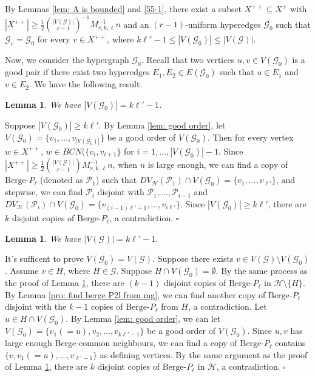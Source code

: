 \documentclass[12pt]{article}%
\newtheorem{lemma}[theorem]{Lemma}
\newenvironment{proof}{{\noindent\it Proof.}}{\hfill $\square$\par}
\newcommand{\ber}{\text{Berge-}}
\newcommand{\mh}{\mathcal{H}}
\newcommand{\mg}{\mathcal{G}}
\begin{document}
By Lemmas \ref{lem: A is bounded} and \ref{55-1},
  there exist a subset $X^{++}\subseteq X^+$ with  $|X^{++}|\ge\frac{1}{2}\binom{|V(\mg)|}{r-1}^{-1}M_{r,k,\ell}^{-1}n$ and an $(r-1)$-uniform hyperedges $\mathcal{G}_0$ such that $\mathcal{G}_v=\mathcal{G}_0$ for every $v\in X^{++}$, where $k\ell'-1\leq |V(\mg_0)|\leq |V(\mg)|$.

Now, we consider the hypergraph $\mathcal{G}_0$.
 Recall that two vertices $u,v\in V(\mg_0)$ is a good pair if there exist two hyperedges $E_1,E_2\in E(\mg_0)$ such that $u\in E_1$ and $v\in E_2$. %
 We have the following result.
 \begin{lemma}\label{lem: bound V(G0)}
     We have $|V(\mg_0)|=k\ell'-1$.
 \end{lemma}
 \begin{proof}
     Suppose $|V(\mg_0)|\geq k\ell'$. By Lemma \ref{lem: good order}, let $V(\mg_0)=\{v_1,\dots,v_{|V(\mg_0)|}\}$ be  a good order of $V(\mg_0)$. Then for every  vertex $w\in X^{++}$, $w\in BCN(\{v_i,v_{i+1}\}$ for $i=1,\dots,|V(\mg_0)|-1$. Since $|X^{++}|\geq \frac{1}{2}\binom{|V(\mg)|}{r-1}M_{r,k,\ell}^{-1}n$, when $n$ is large enough, we can find a copy of $\ber P_{\ell}$ (denoted as $\mathcal{P}_1$) such that $DV_\mh(\mathcal{P}_1)\cap V(\mg_0)=\{v_1,\dots,v_{\ell'}\}$, and stepwise, we can find $\mathcal{P}_i$ disjoint with $\mathcal{P}_1,\dots, \mathcal{P}_{i-1}$ and $DV_\mh(\mathcal{P}_i)\cap V(\mg_0)=\{v_{(i-1)\ell'+1},\dots,v_{i\ell'}\}$. Since  $|V(\mg_0)|\geq k\ell'$, there are $k$ disjoint copies of $\ber P_{\ell}$, a contradiction.
 \end{proof}
\begin{lemma}\label{4.12}
    We have $|V(\mg)|=k\ell'-1$.
\end{lemma}
\begin{proof}
    It's sufficent to prove $V(\mg_0)=V(\mg)$. Suppose there exists $v\in V(\mg)\setminus V(\mg_0)$. Assume $v\in H$, where $H\in \mg$.
     Suppose $H\cap V(\mg_0)=\emptyset.$ By
      the same process as  the proof of Lemma \ref{lem: bound V(G0)}, there are $(k-1)$ disjoint copies of $\ber P_{\ell}$ in $\mh\setminus \{H\}$. By Lemma \ref{pro: find berge P2l from mg}, we can find another copy of $\ber P_{\ell}$ disjoint with the $k-1$ copies of $\ber P_{\ell}$ from $H$, a contradiction. Let $u\in H\cap V(\mg_0)$. By  Lemma \ref{lem: good order}, we can let $V(\mg_0)=\{v_1(=u),v_2,\dots,v_{k\ell'-1}\}$ be a good order of $V(\mg_0)$. Since $u,v$ has large enough Berge-common neighbours, we can find a copy of $\ber P_{\ell}$ contains $\{v,v_1(=u),\dots,v_{\ell'-1}\}$ as defining vertices. By the same argument as the proof of Lemma \ref{lem: bound V(G0)}, there are $k$ disjoint copies of $\ber P_{\ell}$ in $\mh$, a contradiction.
\end{proof}
\end{document}
